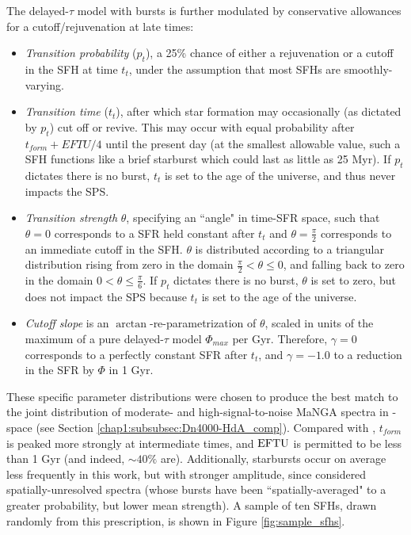The delayed-$\tau$ model with bursts is further modulated by conservative allowances for a cutoff/rejuvenation at late times:

\begin{itemize}
    \item \emph{Transition probability} ($p_t$), a 25\% chance of either a rejuvenation or a cutoff in the SFH at time $t_t$, under the assumption that most SFHs are smoothly-varying.
    \item \emph{Transition time} ($t_{t}$), after which star formation may occasionally (as dictated by $p_t$) cut off or revive. This may occur with equal probability after $t_{form} + EFTU / 4$ until the present day (at the smallest allowable value, such a SFH functions like a brief starburst which could last as little as 25 Myr). If $p_t$ dictates there is no burst, $t_t$ is set to the age of the universe, and thus never impacts the SPS.
    \item \emph{Transition strength} $\theta$, specifying an ``angle" in time-SFR space, such that $\theta = 0$ corresponds to a SFR held constant after $t_t$ and $\theta = \frac{\pi}{2}$ corresponds to an immediate cutoff in the SFH. $\theta$ is distributed according to a triangular distribution rising from zero in the domain $\frac{\pi}{2} < \theta \le 0$, and falling back to zero in the domain $0 < \theta \le \frac{\pi}{6}$. If $p_t$ dictates there is no burst, $\theta$ is set to zero, but does not impact the SPS because $t_t$ is set to the age of the universe.
    \item \emph{Cutoff slope} is an $\arctan$-re-parametrization of $\theta$, scaled in units of the maximum of a pure delayed-$\tau$ model $\Phi_{max}$ per Gyr. Therefore, $\gamma = 0$ corresponds to a perfectly constant SFR after $t_t$, and $\gamma = -1.0$ to a reduction in the SFR by $\Phi$ in 1 Gyr.
\end{itemize}

These specific parameter distributions were chosen to produce the best match to the joint distribution of moderate- and high-signal-to-noise MaNGA spectra in \Dn-\HdeltaA space (see Section \ref{chap1:subsubsec:Dn4000-HdA_comp}). Compared with , $t_{form}$ is peaked more strongly at intermediate times, and ${\rm EFTU}$ is permitted to be less than 1 Gyr (and indeed, $\sim 40\%$ are). Additionally, starbursts occur on average less frequently in this work, but with stronger amplitude, since  considered spatially-unresolved spectra (whose bursts have been ``spatially-averaged" to a greater probability, but lower mean strength). A sample of ten SFHs, drawn randomly from this prescription, is shown in Figure \ref{fig:sample_sfhs}.

